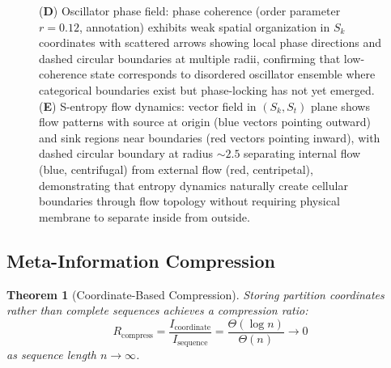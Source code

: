 \documentclass[11pt,a4paper]{article}
\newtheorem{theorem}{Theorem}[section]
\theoremstyle{remark}
\begin{document}
\begin{figure}[htbp]
{(\textbf{D}) Oscillator phase field: phase coherence (order parameter $r = 0.12$, annotation) exhibits weak spatial organization in $S_k$ coordinates with scattered arrows showing local phase directions and dashed circular boundaries at multiple radii, confirming that low-coherence state corresponds to disordered oscillator ensemble where categorical boundaries exist but phase-locking has not yet emerged. 
(\textbf{E}) S-entropy flow dynamics: vector field in $(S_k, S_t)$ plane shows flow patterns with source at origin (blue vectors pointing outward) and sink regions near boundaries (red vectors pointing inward), with dashed circular boundary at radius $\sim 2.5$ separating internal flow (blue, centrifugal) from external flow (red, centripetal), demonstrating that entropy dynamics naturally create cellular boundaries through flow topology without requiring physical membrane to separate inside from outside.}
\label{fig:abstract_cell}
\end{figure}

\subsection{Meta-Information Compression}

\begin{theorem}[Coordinate-Based Compression]
\label{thm:coordinate_compression}
Storing partition coordinates rather than complete sequences achieves a compression ratio:
\begin{equation}
R_{\text{compress}} = \frac{I_{\text{coordinate}}}{I_{\text{sequence}}} = \frac{\Theta(\log n)}{\Theta(n)} \to 0
\end{equation}
as sequence length $n \to \infty$.
\end{theorem}
\end{document}
